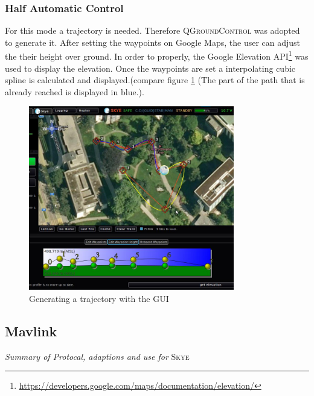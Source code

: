 \subsubsection{Half Automatic Control}
For this mode a trajectory is needed. Therefore \textsc{QGroundControl} was adopted to generate it. After setting the waypoints on Google Maps, the user can adjust the their height over ground. In order to properly, the Google Elevation API\footnote{\url{https://developers.google.com/maps/documentation/elevation/}} was used to display the elevation. Once the waypoints are set a interpolating cubic spline is calculated and displayed.(compare figure \ref{fig:qgc_automatic_control} (The part of the path that is already reached is displayed in blue.). 

\begin{figure}[H] %
	\begin{center}
		\includegraphics[width=0.8\textwidth]{qgc_automatic_control}
		\caption{Generating a trajectory with the GUI}
		\label{fig:qgc_automatic_control}		
	\end{center}
\end{figure}


\subsection{Mavlink}
\textit{Summary of Protocal, adaptions and use for} \textsc{Skye}